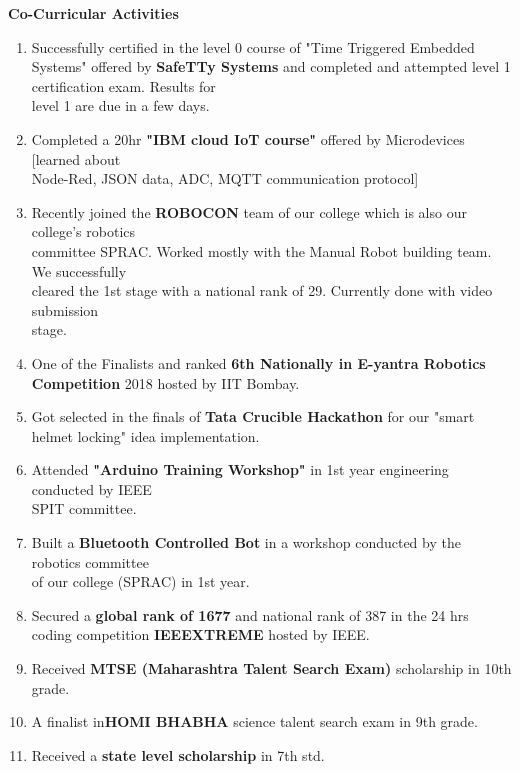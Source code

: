 \documentclass[12pt]{article}
\begin{document}
\begin{flushleft}
\vspace{10mm}
\textbf{Co-Curricular Activities}
\begin{enumerate}
	\item Successfully certified in the level 0 course of "Time Triggered Embedded Systems" offered by \textbf{SafeTTy Systems} and completed and attempted level 1 certification exam. Results for\\ level 1 are due in a few days.  
	\item Completed a 20hr \textbf{"IBM cloud IoT course"} offered by Microdevices [learned about \\Node-Red, JSON data, ADC, MQTT communication protocol]
	\item Recently joined the \textbf{ROBOCON} team of our college which is also our college's robotics \\committee SPRAC. Worked mostly with the Manual Robot building team. We successfully\\ cleared the 1st stage with a national rank of 29. Currently done with video submission \\stage.
	\item One of the Finalists and ranked \textbf{6th Nationally in E-yantra Robotics Competition} 2018 hosted by IIT Bombay.  
	\item Got selected in the finals of \textbf{Tata Crucible Hackathon} for our "smart helmet locking" idea implementation.
	\item Attended \textbf{"Arduino Training Workshop"} in 1st year engineering conducted by IEEE \\SPIT committee.
	\item Built a \textbf{Bluetooth Controlled Bot} in a workshop conducted by the robotics committee \\of our college (SPRAC) in 1st year.
	\item Secured a \textbf{global rank of 1677} and national rank of 387 in the 24 hrs coding competition \textbf{IEEEXTREME} hosted by IEEE.
	\item Received \textbf{MTSE (Maharashtra Talent Search Exam)} scholarship in 10th grade.
	\item A finalist in\textbf{HOMI BHABHA} science talent search exam in 9th grade.
	\item Received a \textbf{state level scholarship} in 7th std.
		
\end{enumerate}

\end{flushleft}
\end{document}
